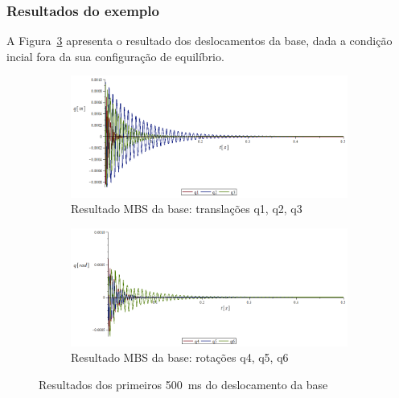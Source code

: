 \subsubsection{Resultados do exemplo}

A Figura~\ref{fig::res_qbase_exemplo} apresenta o resultado dos deslocamentos da
base, dada a condição incial fora da sua configuração de equilíbrio.

\begin{figure}[h]
    \centering
    \begin{subfigure}[b]{0.8\textwidth}
        \includegraphics[width=\textwidth]{figs/q123_base_exemplo}
        \caption{Resultado MBS da base: translações q1, q2, q3}
        \label{fig::q123_base_exemplo}
    \end{subfigure}
    \quad %
    \begin{subfigure}[b]{0.8\textwidth}
        \includegraphics[width=\textwidth]{figs/q456_base_exemplo}
        \caption{Resultado MBS da base: rotações q4, q5, q6}
        \label{fig::q456_base_exemplo}
    \end{subfigure}
    \caption{Resultados dos primeiros 500~ms do deslocamento da base}
    \label{fig::res_qbase_exemplo}
\end{figure}

